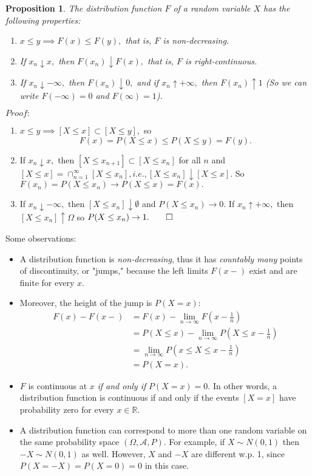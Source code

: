 \documentclass[12pt]{report} \addtolength{\textheight}{2in}
\newtheorem{prop}{Proposition}
\newcommand{\Realnum}{\mathbb{R}}
\newcommand{\bigA}{\mathcal{A}}
\newcommand{\probsp}{(\Omega, \bigA, P)}
\begin{document}
\begin{prop}The distribution function $F$ of a random variable $X$ has the following properties:
\begin{enumerate}[F1:]
\item $x\leq y \implies F(x) \leq F(y),$ that is, $F$ is non-decreasing. 
\item If $x_n \downarrow x,$ then $F(x_n) \downarrow F(x),$ that is, $F$ is right-continuous.
\item If $x_n \downarrow -\infty,$ then $F(x_n)\downarrow 0,$ and if $x_n \uparrow +\infty,$ then $F(x_n)\uparrow 1$ (So we can write $F(-\infty)=0$ and $F(\infty)=1$).
\end{enumerate}
\end{prop}
\newpage
$Proof:$
\begin{enumerate}[F1:]
\item $x\leq y \implies [X\leq x] \subset [X\leq y], $ so
\begin{displaymath}
F(x)=P(X\leq x)\leq P(X\leq y)=F(y).
\end{displaymath}
\item If $x_n \downarrow x,$ then $[X \leq x_{n+1}] \subset [X \leq x_{n}] $ for all $n$ and $[X\leq x]=\cap_{n=1}^{\infty} [X\leq x_{n}], i.e., [X \leq x_n] \downarrow [X \leq x].$ So $F(x_n)=P(X\leq x_n) \to P(X\leq x)=F(x).$
\item If $x_n \downarrow -\infty,$ then $[X\leq x_n] \downarrow \emptyset$ and $P(X\leq x_n)\to 0.$ If $x_n \uparrow +\infty,$ then $[X \leq x_n] \uparrow \Omega$ so $P(X\leq x_n) \to 1. \qed$
\end{enumerate} 
Some observations:
\begin{itemize}
\item A distribution function is \textit{non-decreasing}, thus it has \textit{countably many} points of discontinuity, or "jumps," because the left limits $ F(x-)$ exist and are finite for every $x.$
\item Moreover, the height of the jump is $P(X=x)$:
\begin{align*}
F(x)-F(x-)&=F(x)-\lim_{n\to\infty} F(x-\frac{1}{n})\\
&=P(X\leq x) - \lim_{n\to\infty} P(X\leq x-\frac{1}{n})\\
&=\lim_{n\to\infty}P(x\leq X \leq x-\frac{1}{n}) \\
&=P(X=x).
\end{align*}
\item $F$ is continuous at $x$ \textit{if and only if} $P(X=x)=0.$ In other words, a distribution function is continuous if and only if the events $[X=x]$ have probability zero for every $x\in\Realnum.$ 
\item A distribution function can correspond to more than one random variable on the same probability space $\probsp.$ For example, if $X\sim N(0,1)$ then $-X \sim N(0,1)$ as well. However, $X$ and $-X$ are different w.p. 1, since $P(X=-X)=P(X=0)=0$ in this case.\end{itemize}
\end{document}
